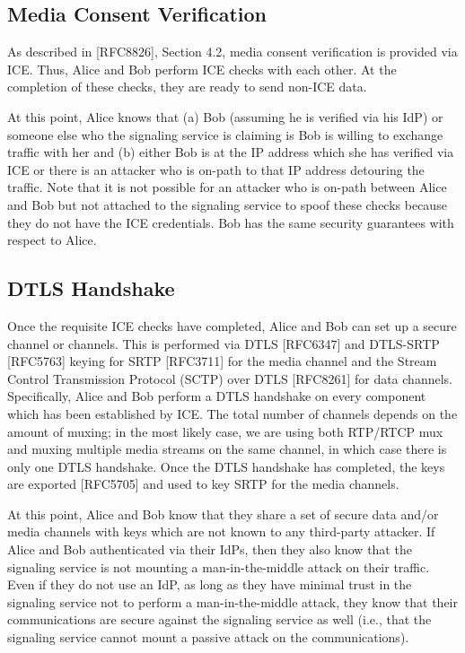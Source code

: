 \documentclass{article}
\begin{document}
\subsection{Media Consent Verification}

As described in [RFC8826], Section 4.2, media consent verification is
provided via ICE.  Thus, Alice and Bob perform ICE checks with each
other.  At the completion of these checks, they are ready to send
non-ICE data.

At this point, Alice knows that (a) Bob (assuming he is verified via
his IdP) or someone else who the signaling service is claiming is Bob
is willing to exchange traffic with her and (b) either Bob is at the
IP address which she has verified via ICE or there is an attacker who
is on-path to that IP address detouring the traffic.  Note that it is
not possible for an attacker who is on-path between Alice and Bob but
not attached to the signaling service to spoof these checks because
they do not have the ICE credentials.  Bob has the same security
guarantees with respect to Alice.

\subsection{DTLS Handshake}

Once the requisite ICE checks have completed, Alice and Bob can set
up a secure channel or channels.  This is performed via DTLS
[RFC6347] and DTLS-SRTP [RFC5763] keying for SRTP [RFC3711] for the
media channel and the Stream Control Transmission Protocol (SCTP)
over DTLS [RFC8261] for data channels.  Specifically, Alice and Bob
perform a DTLS handshake on every component which has been
established by ICE.  The total number of channels depends on the
amount of muxing; in the most likely case, we are using both RTP/RTCP
mux and muxing multiple media streams on the same channel, in which
case there is only one DTLS handshake.  Once the DTLS handshake has
completed, the keys are exported [RFC5705] and used to key SRTP for
the media channels.

At this point, Alice and Bob know that they share a set of secure
data and/or media channels with keys which are not known to any
third-party attacker.  If Alice and Bob authenticated via their IdPs,
then they also know that the signaling service is not mounting a man-in-the-middle attack on their traffic.  Even if they do not use an
IdP, as long as they have minimal trust in the signaling service not
to perform a man-in-the-middle attack, they know that their
communications are secure against the signaling service as well
(i.e., that the signaling service cannot mount a passive attack on
the communications).
\end{document}
